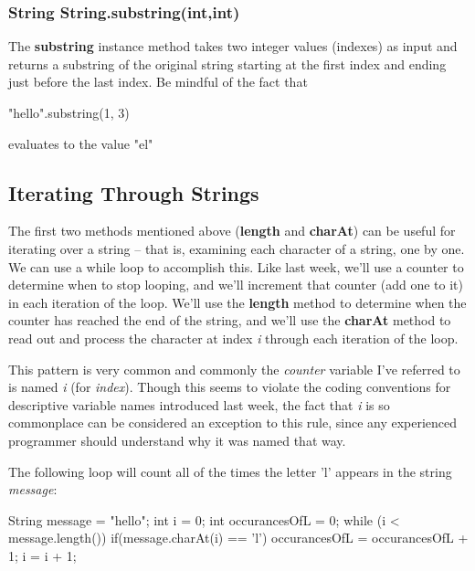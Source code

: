 \subsubsection{String String.substring(int,int)}

The \textbf{substring} instance method takes two integer values (indexes) as input and returns a substring of the original string starting at the first index and ending just before the last index. Be mindful of the fact that


\begin{exa}

\begin{code} 
"hello".substring(1, 3) 
\end{code}

evaluates to the value "el"
\end{exa}



\subsection{Iterating Through Strings}

The first two methods mentioned above (\textbf{length} and \textbf{charAt}) can be useful for iterating over a string -- that is, examining each character of a string, one by one. We can use a while loop to accomplish this. Like last week, we'll use a counter to determine when to stop looping, and we'll increment that counter (add one to it) in each iteration of the loop. We'll use the \textbf{length} method to determine when the counter has reached the end of the string, and we'll use the \textbf{charAt} method to read out and process the character at index \textit{i} through each iteration of the loop.

This pattern is very common and commonly the \textit{counter} variable I've referred to is named \textit{i} (for \textit{index}). Though this seems to violate the coding conventions for descriptive variable names introduced last week, the fact that \textit{i} is so commonplace can be considered an exception to this rule, since any experienced programmer should understand why it was named that way.

\begin{exa}

The following loop will count all of the times the letter 'l' appears in the string \textit{message}:

\begin{code}
String message = "hello";
int i = 0;
int occurancesOfL = 0;
while (i < message.length()) {
  if(message.charAt(i) == 'l') {
    occurancesOfL = occurancesOfL + 1;
  }
  i = i + 1;
}
\end{code}

\end{exa}


